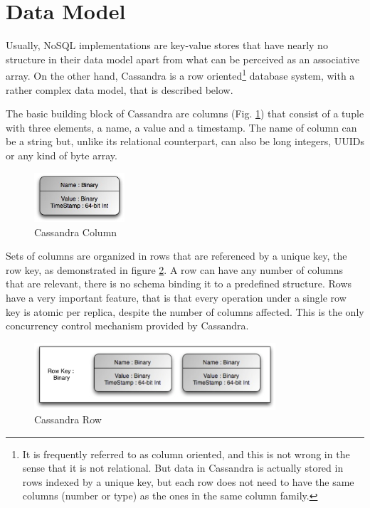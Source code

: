 \section{Data Model}
\label{sec:cass_data_model}
Usually, NoSQL implementations are key-value stores that have nearly no structure in their data model apart from what can be perceived as an associative array. On the other hand, Cassandra is a row oriented\footnote{It is frequently referred to as column oriented, and this is not wrong in the sense that it is not relational. But data in Cassandra is actually stored in rows indexed by a unique key, but each row does not need to have the same columns (number or type) as the ones in the same column family.} database system, with a rather complex data model\cite{sarkissian09}, that is described below.

The basic building block of Cassandra are columns (Fig. \ref{fig:column}) that consist of a tuple with three elements, a name, a value and a timestamp. The name of column can be a string but, unlike its relational counterpart, can also be long integers, UUIDs or any kind of byte array.

\begin{figure}[htb]
  \begin{center}
    \leavevmode
    \includegraphics[width=0.3\textwidth]{images/column.jpg}
  \end{center}
  \caption{Cassandra Column}
  \label{fig:column}
\end{figure}

Sets of columns are organized in rows that are referenced by a unique key, the row key, as demonstrated in figure \ref{fig:row}. A row can have any number of columns that are relevant, there is no schema binding it to a predefined structure. Rows have a very important feature, that is that every operation under a single row key is atomic per replica, despite the number of columns affected. This is the only concurrency control mechanism provided by Cassandra.

\begin{figure}[!htb]
  \begin{center}
    \leavevmode
    \includegraphics[width=0.8\textwidth]{images/row}
  \end{center}
  \caption{Cassandra Row}
  \label{fig:row}
\end{figure}

